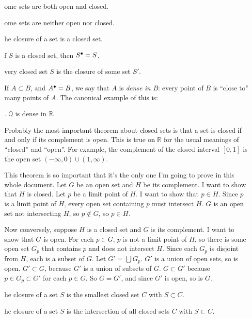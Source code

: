 \documentclass{article}
\def\R{{\mathbb R}}
\newcounter{exercisecounter}\setcounter{exercisecounter}{1}
\def\Exercise.#1\par{{\item\small {\bf Exercise \number\theexercisecounter}.#1\addtocounter{exercisecounter}{1}}}
\def\clos#1{\smash{#1}^\bullet\vphantom{#1}}
\begin{document}
\begin{itemize}
\Exercise. Some sets are both open and closed.

\Exercise. Some sets are neither open nor closed.

\Exercise. The closure of a set is a closed set.

\Exercise. if $S$ is a closed set, then $\clos S = S$.

\Exercise. Every closed set $S$ is the closure of some set $S'$. 

\end{itemize}

If $A\subset B$, and $\clos A = B$, we say that
$A$ is {\em dense in $B$}: every point of $B$ is ``close to'' many
points of  $A$.  The canonical example of this is:

\begin{itemize}
\Exercise. $\mathbb Q$ is dense in $\R$.

\end{itemize}

Probably the most important theorem about closed sets is that a set is
closed if and only if its complement is open.    This is
true on $\R$ for the usual meanings of ``closed'' and ``open''.  For
example, the complement of the closed interval $[0, 1]$ is the open
set $(-\infty, 0) \cup (1, \infty)$.

This theorem is so important that it's the only one I'm going to prove
in this whole document.  Let $G$ be an open set and $H$ be its
complement.  I want to show that $H$ is closed.  Let $p$ be a limit
point of $H$.  I want to show that $p\in H$.  Since $p$ is a limit
point of $H$, every open set containing $p$ must intersect $H$.  $G$
is an open set not intersecting $H$, so $p\not\in G$, so $p\in H$.

Now conversely, suppose $H$ is a closed set and $G$ is its
complement.  I want to show that $G$ is open.  For each $p\in G$, $p$
is not a limit point of $H$, so there is some open set $G_p$ that
contains $p$ and does not intersect $H$.  Since each $G_p$ is disjoint
from $H$, each is a subset of $G$.   Let $G'=\bigcup G_p$.  $G'$ is a
union of open sets, so is open.
$G'\subset G$, because $G'$ is a union of subsets of $G$.  
$G\subset G'$ because $p\in G_p\subset G'$ for each $p\in G$.
So $G=G'$, and since $G'$ is open, so is $G$.

\begin{itemize}
\Exercise. The closure of a set $S$ is the smallest closed set $C$
with $S\subset C$.

\Exercise. The closure of a set $S$ is the intersection of all closed sets $C$
with $S\subset C$.


\end{itemize}
\end{document}
